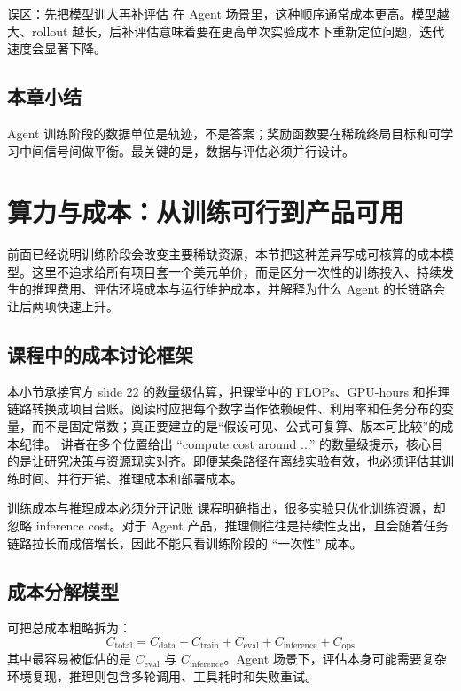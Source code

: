 \documentclass[a4paper]{article}
\begin{document}
\begin{warningbox}{误区：先把模型训大再补评估}
在 Agent 场景里，这种顺序通常成本更高。模型越大、rollout 越长，后补评估意味着要在更高单次实验成本下重新定位问题，迭代速度会显著下降。
\end{warningbox}

\subsection{本章小结}
Agent 训练阶段的数据单位是轨迹，不是答案；奖励函数要在稀疏终局目标和可学习中间信号间做平衡。最关键的是，数据与评估必须并行设计。


\section{算力与成本：从训练可行到产品可用}

前面已经说明训练阶段会改变主要稀缺资源，本节把这种差异写成可核算的成本模型。这里不追求给所有项目套一个美元单价，而是区分一次性的训练投入、持续发生的推理费用、评估环境成本与运行维护成本，并解释为什么 Agent 的长链路会让后两项快速上升。

\subsection{课程中的成本讨论框架}
本小节承接官方 slide 22 的数量级估算，把课堂中的 FLOPs、GPU-hours 和推理链路转换成项目台账。阅读时应把每个数字当作依赖硬件、利用率和任务分布的变量，而不是固定常数；真正要建立的是“假设可见、公式可复算、版本可比较”的成本纪律。
讲者在多个位置给出 ``compute cost around ...'' 的数量级提示，核心目的是让研究决策与资源现实对齐。即便某条路径在离线实验有效，也必须评估其训练时间、并行开销、推理成本和部署成本。

\begin{importantbox}{训练成本与推理成本必须分开记账}
课程明确指出，很多实验只优化训练资源，却忽略 inference cost。对于 Agent 产品，推理侧往往是持续性支出，且会随着任务链路拉长而成倍增长，因此不能只看训练阶段的 ``一次性'' 成本。
\end{importantbox}

\subsection{成本分解模型}
可把总成本粗略拆为：
\[
C_{\text{total}} = C_{\text{data}} + C_{\text{train}} + C_{\text{eval}} + C_{\text{inference}} + C_{\text{ops}}
\]
其中最容易被低估的是 $C_{\text{eval}}$ 与 $C_{\text{inference}}$。Agent 场景下，评估本身可能需要复杂环境复现，推理则包含多轮调用、工具耗时和失败重试。
\end{document}
